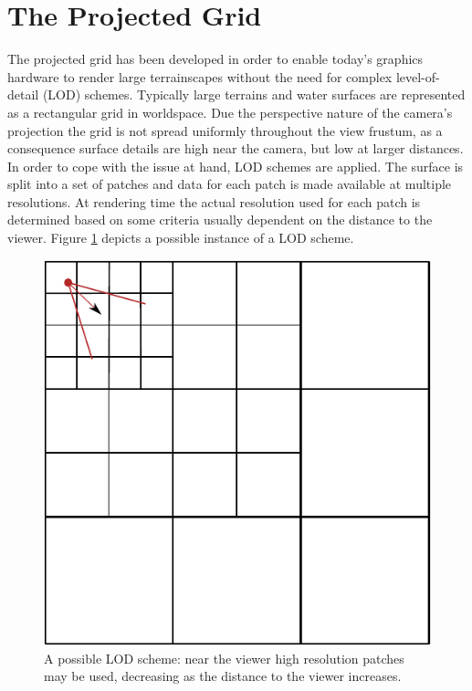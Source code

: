 \section{The Projected Grid}
The projected grid has been developed in order to enable today's graphics
hardware to render large terrainscapes without the need for complex
level-of-detail (LOD) schemes. Typically large terrains and water surfaces are
represented as a rectangular grid in worldspace. Due the perspective nature of
the camera's projection the grid is not spread uniformly throughout the view
frustum, as a consequence surface details are high near the camera, but low at
larger distances. In order to cope with the issue at hand, LOD schemes are
applied. The surface is split into a set of patches and data for each patch is
made available at multiple resolutions. At rendering time the actual resolution
used for each patch is determined based on some criteria usually dependent on
the distance to the viewer. Figure \ref{fig:lodscheme} depicts a possible
instance of a LOD scheme.
\begin{figure}
\begin{center}
\includegraphics[scale=0.8]{Images/LODScheme.pdf}
\caption[LOD scheme]{A possible LOD scheme: near the viewer high resolution
patches may be used, decreasing as the distance to the viewer increases. }
\label{fig:lodscheme}
\end{center}
\end{figure}
